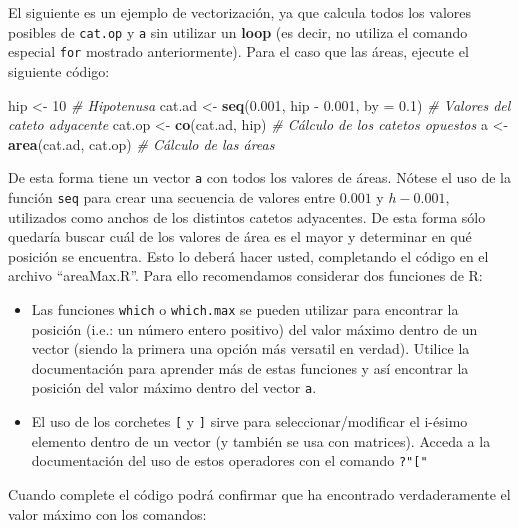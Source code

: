 \documentclass[]{article}
\newenvironment{Shaded}{}{}
\newcommand{\KeywordTok}[1]{\textcolor[rgb]{0.00,0.44,0.13}{\textbf{{#1}}}}
\newcommand{\DataTypeTok}[1]{\textcolor[rgb]{0.56,0.13,0.00}{{#1}}}
\newcommand{\DecValTok}[1]{\textcolor[rgb]{0.25,0.63,0.44}{{#1}}}
\newcommand{\FloatTok}[1]{\textcolor[rgb]{0.25,0.63,0.44}{{#1}}}
\newcommand{\CommentTok}[1]{\textcolor[rgb]{0.38,0.63,0.69}{\textit{{#1}}}}
\newcommand{\NormalTok}[1]{{#1}}
\begin{document}
El siguiente es un ejemplo de vectorización, ya que calcula todos los
valores posibles de \texttt{cat.op} y \texttt{a} sin utilizar un
\textbf{loop} (es decir, no utiliza el comando especial \texttt{for}
mostrado anteriormente). Para el caso que las áreas, ejecute el
siguiente código:

\begin{Shaded}
\begin{Highlighting}[]
\NormalTok{hip <- }\DecValTok{10}  \CommentTok{# Hipotenusa}
\NormalTok{cat.ad <- }\KeywordTok{seq}\NormalTok{(}\FloatTok{0.001}\NormalTok{, hip - }\FloatTok{0.001}\NormalTok{, }\DataTypeTok{by =} \FloatTok{0.1}\NormalTok{)  }\CommentTok{# Valores del cateto adyacente}
\NormalTok{cat.op <- }\KeywordTok{co}\NormalTok{(cat.ad, hip)  }\CommentTok{# Cálculo de los catetos opuestos}
\NormalTok{a <- }\KeywordTok{area}\NormalTok{(cat.ad, cat.op)  }\CommentTok{# Cálculo de las áreas}
\end{Highlighting}
\end{Shaded}
De esta forma tiene un vector \texttt{a} con todos los valores de áreas.
Nótese el uso de la función \texttt{seq} para crear una secuencia de
valores entre $0.001$ y $h - 0.001$, utilizados como anchos de los
distintos catetos adyacentes. De esta forma sólo quedaría buscar cuál de
los valores de área es el mayor y determinar en qué posición se
encuentra. Esto lo deberá hacer usted, completando el código en el
archivo ``areaMax.R''. Para ello recomendamos considerar dos funciones
de R:

\begin{itemize}
\item
  Las funciones \texttt{which} o \texttt{which.max} se pueden utilizar
  para encontrar la posición (i.e.: un número entero positivo) del valor
  máximo dentro de un vector (siendo la primera una opción más versatil
  en verdad). Utilice la documentación para aprender más de estas
  funciones y así encontrar la posición del valor máximo dentro del
  vector \texttt{a}.
\item
  El uso de los corchetes \texttt{{[}} y \texttt{{]}} sirve para
  seleccionar/modificar el i-ésimo elemento dentro de un vector (y
  también se usa con matrices). Acceda a la documentación del uso de
  estos operadores con el comando \texttt{?"{[}"}
\end{itemize}
Cuando complete el código podrá confirmar que ha encontrado
verdaderamente el valor máximo con los comandos:
\end{document}
